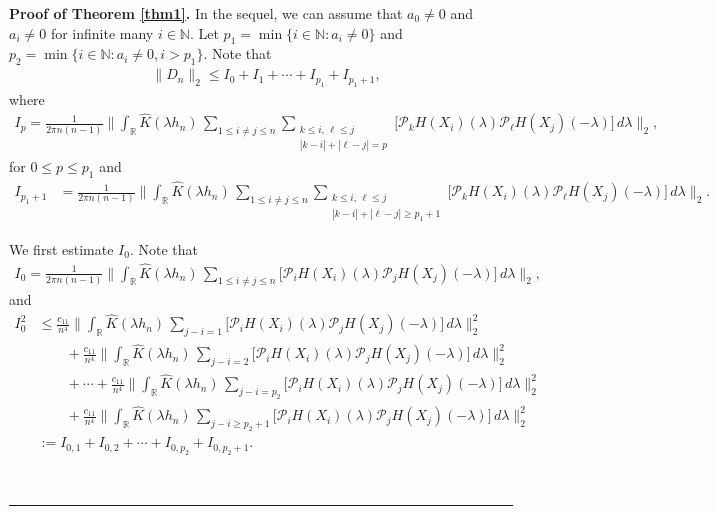 \documentclass[11pt]{article}
\newenvironment{proof}[1][Proof]{\textbf{#1.} }{\
\rule{0.5em}{0.5em}}
\def\R{{\mathbb R}}
\def\N{{\mathbb N}}
\begin{document}
\begin{proof}[Proof of Theorem \ref{thm1}]
In the sequel, we can assume that $a_0\ne 0$ and $a_i\neq 0$ for infinite many $i\in \N$. Let $p_1=\min\{i\in\N: a_i\neq 0\}$ and $p_2=\min\{i\in \N: a_i\neq 0, i>p_1\}$. Note that
\begin{align}  \label{L1}
&\|D_n\|_2\leq I_0+I_1+\cdots +I_{p_1}+I_{p_1+1},
\end{align}
where 
\begin{align*}
I_p=\frac{1}{2\pi n(n-1)} \Big\|\int_{\R} \widehat{K}(\lambda h_n)\,  \sum_{1\leq i\neq j\leq n} \sum_{\substack{ k\leq i,\, \ell\leq j\\ |k-i|+|\ell-j|= p}}\big[\mathcal{P}_{k}H(X_i)(\lambda)\mathcal{P}_{\ell}H(X_j)(-\lambda)\big] \, d\lambda\Big\|_2,
\end{align*}
for $0\le p\le p_1$ and 
\begin{align*}
I_{p_1+1}&=\frac{1}{2\pi n(n-1)}  \Big\| \int_{\R} \widehat{K}(\lambda h_n)\, \sum_{1\leq i\neq j\leq n} \sum_{\substack{ k\leq i,\, \ell\leq j\\ |k-i|+|\ell-j|\geq p_1+1}}\big[\mathcal{P}_{k}H(X_i)(\lambda)\mathcal{P}_{\ell}H(X_j)(-\lambda)\big]\, d\lambda \Big\|_2.
\end{align*}

We first estimate $I_0$. Note that 
\begin{align*}
I_{0}=\frac{1}{2\pi n(n-1)} \Big\|\int_{\R} \widehat{K}(\lambda h_n)\,  \sum_{1\leq i\neq j\leq n} \big[\mathcal{P}_{i}H(X_i)(\lambda)\mathcal{P}_{j}H(X_j)(-\lambda)\big] \, d\lambda\Big\|_2,
\end{align*}
and 
\begin{align*}
I^2_0
&\leq \frac{c_{11}}{n^4} \Big\|\int_{\R} \widehat{K}(\lambda h_n)\,  \sum_{j-i=1} \big[\mathcal{P}_{i}H(X_i)(\lambda)\mathcal{P}_{j}H(X_j)(-\lambda)\big] \, d\lambda\Big\|^2_2\\
&\qquad+\frac{c_{11}}{n^4} \Big\|\int_{\R} \widehat{K}(\lambda h_n)\,  \sum_{j-i=2} \big[\mathcal{P}_{i}H(X_i)(\lambda)\mathcal{P}_{j}H(X_j)(-\lambda)\big] \, d\lambda\Big\|^2_2\\
&\qquad+\cdots+ \frac{c_{11}}{n^4} \Big\|\int_{\R} \widehat{K}(\lambda h_n)\,  \sum_{j-i=p_2} \big[\mathcal{P}_{i}H(X_i)(\lambda)\mathcal{P}_{j}H(X_j)(-\lambda)\big] \, d\lambda\Big\|^2_2\\
&\qquad+\frac{c_{11}}{n^4} \Big\|\int_{\R} \widehat{K}(\lambda h_n)\,  \sum_{j-i\geq p_2+1} \big[\mathcal{P}_{i}H(X_i)(\lambda)\mathcal{P}_{j}H(X_j)(-\lambda)\big] \, d\lambda\Big\|^2_2\\
&:=I_{0,1}+I_{0,2}+\cdots+ I_{0, p_2}+ I_{0, p_2+1}.
\end{align*}


\end{proof}
\end{document}
